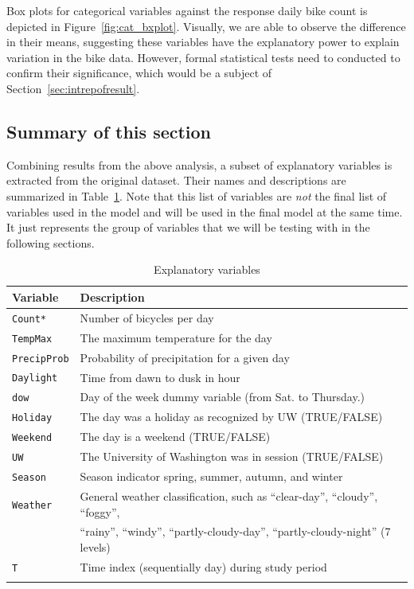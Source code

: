 \documentclass [11pt, proquest] {uwthesis}[2015/03/03]
\begin{document}
Box plots for categorical variables against the response daily bike count is depicted in Figure~\ref{fig:cat_bxplot}. Visually, we are able to observe the difference in their means, suggesting these variables have the explanatory power to explain variation in the bike data. However, formal statistical tests need to conducted to confirm their significance, which would be a subject of Section~\ref{sec:intrepofresult}.

\subsection{Summary of this section}

Combining results from the above analysis, a subset of explanatory variables is extracted from the original dataset. Their names and descriptions are summarized in Table~\ref{tb:variables}. Note that this list of variables are \emph{not} the final list of variables used in the model and will be used in the final model at the same time. It just represents the group of variables that we will be testing with in the following sections. 

\begin{table}
\begin{center}
\caption{Explanatory variables}
\vspace{10pt}
\begin{tabular}{l l} 
 \hline
Variable & Description \\
\hline
\texttt{Count*} & Number of bicycles per day \\
\texttt{TempMax} & The maximum temperature for the day \\
\texttt{PrecipProb} & Probability of precipitation for a given day \\
\texttt{Daylight} & Time from dawn to dusk in hour\\
\texttt{dow} & Day of the week dummy variable (from Sat. to Thursday.) \\
\texttt{Holiday} & The day was a holiday as recognized by UW (TRUE/FALSE) \\
\texttt{Weekend} & The day is a weekend (TRUE/FALSE) \\
\texttt{UW} & The University of Washington was in session (TRUE/FALSE) \\
\texttt{Season} & Season indicator spring, summer, autumn, and winter \\
\texttt{Weather} & General weather classification, such as ``clear-day'', ``cloudy'', ``foggy'', \\
 & ``rainy'', ``windy'', ``partly-cloudy-day'', ``partly-cloudy-night'' (7 levels)\\
\texttt{T}  & Time index (sequentially day) during study period \\
\hline
\label{tb:variables}
\end{tabular}
\end{center}
\end{table}
\end{document}
